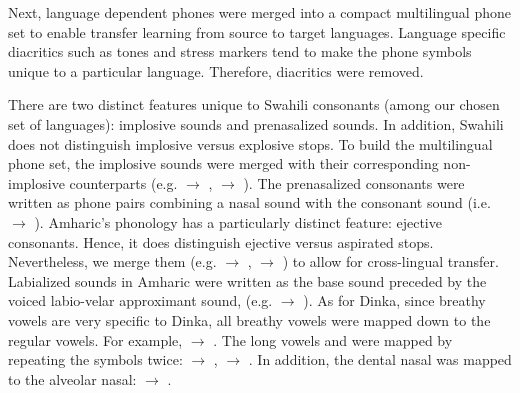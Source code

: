 \documentclass[a4paper]{article}
\begin{document}
Next, language dependent phones were merged into a compact multilingual phone set to enable transfer learning from source to target languages. Language specific diacritics such as tones and stress markers tend to make the phone symbols unique to a particular language. Therefore, diacritics were removed.

There are two distinct features unique to Swahili consonants (among our chosen set of languages): implosive sounds and prenasalized sounds. In addition, Swahili does not distinguish implosive versus explosive stops. To build the multilingual phone set, the implosive sounds were merged with their corresponding non-implosive counterparts (e.g.  $\rightarrow$ ,  $\rightarrow$ ). The prenasalized consonants were written as phone pairs combining a nasal sound with the consonant sound (i.e.  $\rightarrow$  ). Amharic's phonology has a particularly distinct feature: ejective consonants. Hence, it does distinguish ejective versus aspirated stops. Nevertheless, we merge them (e.g.  $\rightarrow$ ,  $\rightarrow$ ) to allow for cross-lingual transfer. Labialized sounds in Amharic were written as the base sound preceded by the voiced labio-velar approximant sound,  (e.g.  $\rightarrow$  ). As for Dinka, since breathy vowels are very specific to Dinka, all breathy vowels were mapped down to the regular vowels. For example,  $\rightarrow$ . The long vowels  and  were mapped by repeating the symbols twice:  $\rightarrow$ ,  $\rightarrow$ . In addition, the dental nasal was mapped to the alveolar nasal: \textipa{\|[n} $\rightarrow$ .

\end{document}
